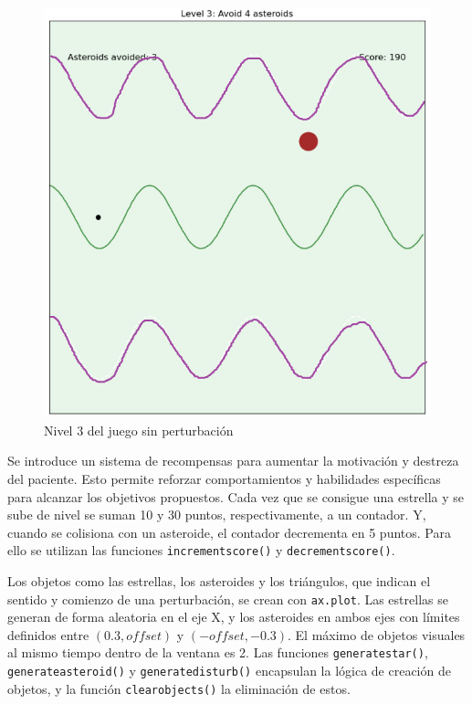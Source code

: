 \begin{figure}[ht!]
	\centering
	\begin{minipage}{0.65\linewidth}
		\centering
		\includegraphics[width=\linewidth]{figs/flappy_level3.png}
	\end{minipage}
	\caption[Nivel 3 del juego sin perturbación]{Nivel 3 del juego sin perturbación}
	\label{fig:level3}
\end{figure}

Se introduce un sistema de recompensas para aumentar la motivación y destreza del paciente.
Esto permite reforzar comportamientos y habilidades específicas para alcanzar los objetivos propuestos.
Cada vez que se consigue una estrella y se sube de nivel se suman 10 y 30 puntos, respectivamente, a un contador.
Y, cuando se colisiona con un asteroide, el contador decrementa en 5 puntos.
Para ello se utilizan las funciones \verb|incrementscore()| y \verb|decrementscore()|.

Los objetos como las estrellas, los asteroides y los triángulos, que indican el sentido y comienzo de una perturbación, se crean con \verb|ax.plot|.
Las estrellas se generan de forma aleatoria en el eje X, y los asteroides en ambos ejes con límites definidos entre $(0.3, offset)$ y $(-offset, -0.3)$.
El máximo de objetos visuales al mismo tiempo dentro de la ventana es 2.
Las funciones \verb|generatestar()|, \verb|generateasteroid()| y \verb|generatedisturb()| encapsulan la lógica de creación de objetos, y la función \verb|clearobjects()| la eliminación de estos.

